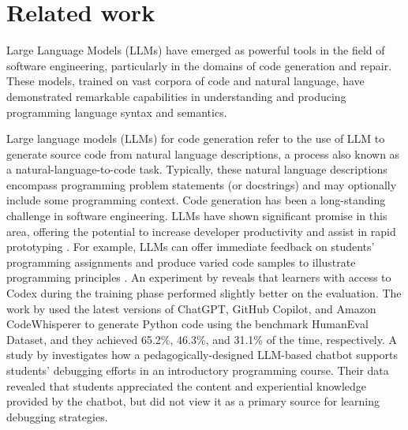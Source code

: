 \section{Related work}

Large Language Models (LLMs) have emerged as powerful tools in the field of software engineering, particularly in the domains of code generation and repair. These models, trained on vast corpora of code and natural language, have demonstrated remarkable capabilities in understanding and producing programming language syntax and semantics.

Large language models (LLMs) for code generation refer to the use of LLM to generate source code from natural language descriptions, a process also known as a natural-language-to-code task. Typically, these natural language descriptions encompass programming problem statements (or docstrings) and may optionally include some programming context. Code generation has been a long-standing challenge in software engineering. LLMs have shown significant promise in this area, offering the potential to increase developer productivity and assist in rapid prototyping \cite{10.5555/3618408.3618894,wu2024repoformerselectiveretrievalrepositorylevel,DBLP:conf/acl/LuDHGHS22}. For example, LLMs can offer immediate feedback on students' programming assignments and produce varied code samples to illustrate programming principles \cite{kumar2024impactguidanceinteractionstrategies}. An experiment by \cite{10.1145/3545945.3569830} reveals that learners with access to Codex during the training phase performed slightly better on the evaluation. The work by \cite{yetiştiren2023evaluatingcodequalityaiassisted} used the latest versions of ChatGPT, GitHub Copilot, and Amazon CodeWhisperer to generate Python code using the benchmark HumanEval Dataset, and they achieved 65.2\%, 46.3\%, and 31.1\% of the time, respectively. A study by \cite{10.1145/3544548.3580919} investigates how a pedagogically-designed LLM-based chatbot supports students’ debugging efforts in an introductory programming course. Their data revealed that students appreciated the content and experiential knowledge provided by the chatbot, but did not view it as a primary source for learning debugging strategies. 



